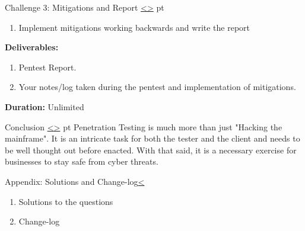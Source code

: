 \documentclass[12pt]{extarticle}
\newenvironment{instructionblock}{\Large\bgroup}{\egroup}
\newcounter{next}
\newcounter{prev}
\begin{document}
\pagebreak
{}
\begin{slide}{Challenge 3: Mitigations and Report}
{\hyperref[slide \theprev]{\textless}\hyperref[slide \thenext]{\textgreater}}
	 pt
	\begin{instructionblock}
		\begin{enumerate}
            \item Implement mitigations working backwards and write the report
		\end{enumerate}
        \textbf{Deliverables:} 
        \begin{enumerate}[noitemsep,topsep=0pt]
        	\item Pentest Report.
            \item Your notes/log taken during the pentest and implementation of mitigations.\\
        \end{enumerate}
        \textbf{Duration:} Unlimited
	\end{instructionblock}
\end{slide}

\pagebreak
{}
\begin{slide}{Conclusion}
{\hyperref[slide \theprev]{\textless}\hyperref[slide \thenext]{\textgreater}}
	 pt
	\begin{instructionblock}
		Penetration Testing is much more than just "Hacking the mainframe". It is an intricate task for both the tester and the client and needs to be well thought out before enacted. With that said, it is a necessary exercise for businesses to stay safe from cyber threats.
	\end{instructionblock}
\end{slide}

\vfill
\pagebreak
{}
\begin{slide}{Appendix: Solutions and Change-log}{\hyperref[slide \theprev]{\textless}}
	\begin{instructionblock}
		\begin{enumerate}
			\item {Solutions to the questions}
			\item {Change-log}
		\end{enumerate}
	\end{instructionblock}
\end{slide}
\end{document}

